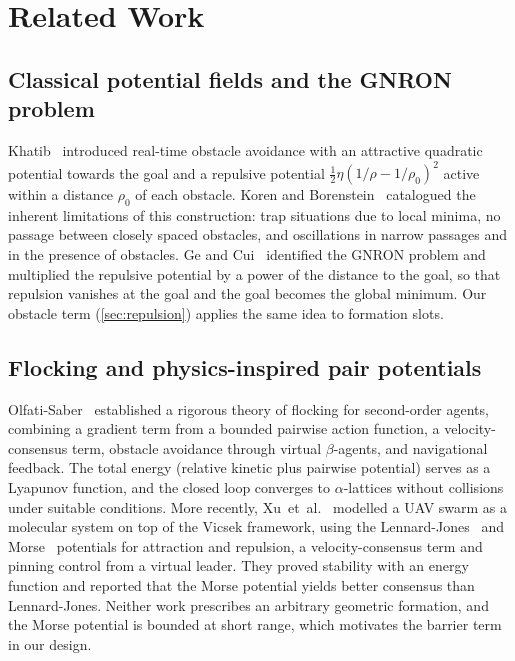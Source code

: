 \documentclass[11pt]{article}
\theoremstyle{definition}
\theoremstyle{remark}
\begin{document}
\section{Related Work}\label{sec:related}

\subsection{Classical potential fields and the GNRON problem}
Khatib~\cite{khatib1986} introduced real-time obstacle avoidance with an
attractive quadratic potential towards the goal and a repulsive potential
$\tfrac12\eta(1/\rho-1/\rho_0)^2$ active within a distance $\rho_0$ of each
obstacle. Koren and Borenstein~\cite{koren1991} catalogued the inherent
limitations of this construction: trap situations due to local minima, no
passage between closely spaced obstacles, and oscillations in narrow passages
and in the presence of obstacles. Ge and Cui~\cite{ge2000} identified the GNRON
problem and multiplied the repulsive potential by a power of the distance to the
goal, so that repulsion vanishes at the goal and the goal becomes the global
minimum. Our obstacle term (\cref{sec:repulsion}) applies the same idea to
formation slots.

\subsection{Flocking and physics-inspired pair potentials}
Olfati-Saber~\cite{olfati2006} established a rigorous theory of flocking for
second-order agents, combining a gradient term from a bounded pairwise action
function, a velocity-consensus term, obstacle avoidance through virtual
$\beta$-agents, and navigational feedback. The total energy (relative kinetic
plus pairwise potential) serves as a Lyapunov function, and the closed loop
converges to $\alpha$-lattices without collisions under suitable conditions.
More recently, Xu~et~al.~\cite{xu2025consensus} modelled a UAV swarm as a
molecular system on top of the Vicsek framework, using the
Lennard-Jones~\cite{lennardjones1924} and Morse~\cite{morse1929} potentials for
attraction and repulsion, a velocity-consensus term and pinning control from a
virtual leader. They proved stability with an energy function and reported that
the Morse potential yields better consensus than Lennard-Jones. Neither work
prescribes an arbitrary geometric formation, and the Morse potential is bounded
at short range, which motivates the barrier term in our design.
\end{document}
